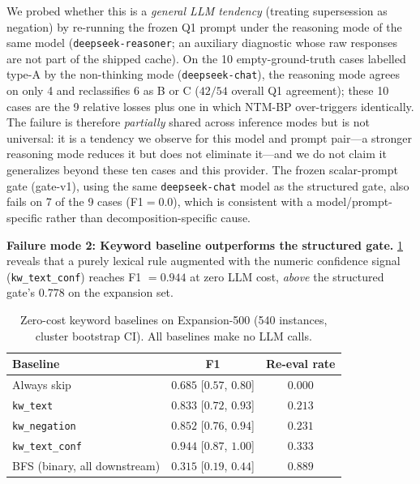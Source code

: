 \documentclass{article}
\theoremstyle{definition}
\begin{document}
We probed whether this is a \emph{general LLM tendency} (treating
supersession as negation) by re-running the frozen Q1 prompt under the
reasoning mode of the same model (\texttt{deepseek-reasoner}; an auxiliary
diagnostic whose raw responses are not part of the shipped cache).  On the
10 empty-ground-truth cases labelled type-A by the non-thinking mode
(\texttt{deepseek-chat}), the reasoning mode
agrees on only 4 and reclassifies 6 as B or C ($42/54$ overall Q1
agreement); these 10 cases are the 9 relative losses plus one in which
NTM-BP over-triggers identically.  The failure is therefore
\emph{partially} shared across inference modes but is not universal: it is
a tendency we observe for this model and prompt pair---a stronger
reasoning mode reduces it but does not eliminate it---and we do not
claim it generalizes beyond these ten cases and this provider.
The frozen scalar-prompt gate (gate-v1), using the same
\texttt{deepseek-chat} model as the structured gate, also fails on 7 of
the 9 cases (F1$=0.0$), which is consistent with a model/prompt-specific
rather than decomposition-specific cause.

\textbf{Failure mode 2: Keyword baseline outperforms the structured
gate.}
\cref{tab:kwbaseline} reveals that a purely lexical rule augmented with
the numeric confidence signal (\texttt{kw\_text\_conf}) reaches F1
$=0.944$ at zero LLM cost, \emph{above} the structured gate's $0.778$
on the expansion set.

\begin{table}[t]
\centering
\caption{Zero-cost keyword baselines on Expansion-500 (540 instances,
  cluster bootstrap CI).  All baselines make no LLM calls.}
\label{tab:kwbaseline}
\begin{tabular}{lcc}
\toprule
Baseline & F1 & Re-eval rate \\
\midrule
Always skip                    & $0.685$ [$0.57$, $0.80$] & $0.000$ \\
\texttt{kw\_text}              & $0.833$ [$0.72$, $0.93$] & $0.213$ \\
\texttt{kw\_negation}          & $0.852$ [$0.76$, $0.94$] & $0.231$ \\
\texttt{kw\_text\_conf}        & $0.944$ [$0.87$, $1.00$] & $0.333$ \\
BFS (binary, all downstream)   & $0.315$ [$0.19$, $0.44$] & $0.889$ \\
\bottomrule
\end{tabular}
\end{table}
\end{document}
